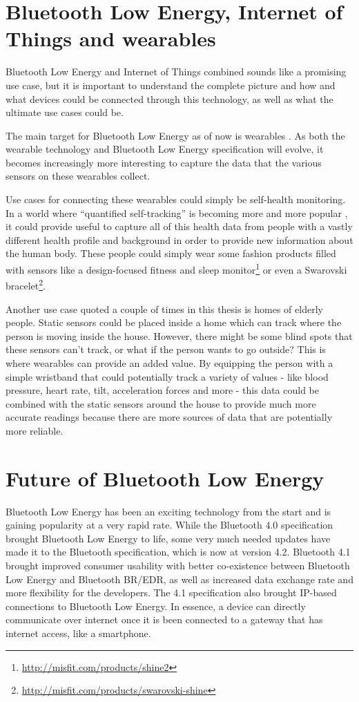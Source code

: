 \documentclass[pdftex,a4paper,12pt,twoside]{report}
\begin{document}
\section{Bluetooth Low Energy, Internet of Things and wearables}
\label{sec:bleiotwearables}
Bluetooth Low Energy and Internet of Things combined sounds like a promising use case, but it is important to understand the complete picture and how and what devices could be connected through this technology, as well as what the ultimate use cases could be.

The main target for Bluetooth Low Energy as of now is wearables \citep{blakesnow2016}. As both the wearable technology and Bluetooth Low Energy specification will evolve, it becomes increasingly more interesting to capture the data that the various sensors on these wearables collect.

Use cases for connecting these wearables could simply be self-health monitoring. In a world where ``quantified self-tracking'' is becoming more and more popular \citep{swan2012sensor}, it could provide useful to capture all of this health data from people with a vastly different health profile and background in order to provide new information about the human body. These people could simply wear some fashion products filled with sensors like a design-focused fitness and sleep monitor\footnote{\url{http://misfit.com/products/shine2}} or even a Swarovski bracelet\footnote{\url{http://misfit.com/products/swarovski-shine}}.

Another use case quoted a couple of times in this thesis is homes of elderly people. Static sensors could be placed inside a home which can track where the person is moving inside the house. However, there might be some blind spots that these sensors can't track, or what if the person wants to go outside? This is where wearables can provide an added value. By equipping the person with a simple wristband that could potentially track a variety of values - like blood pressure, heart rate, tilt, acceleration forces and more - this data could be combined with the static sensors around the house to provide much more accurate readings because there are more sources of data that are potentially more reliable.


\section{Future of Bluetooth Low Energy}
\label{sec:futureble}
Bluetooth Low Energy has been an exciting technology from the start and is gaining popularity at a very rapid rate. While the Bluetooth 4.0 specification brought Bluetooth Low Energy to life, some very much needed updates have made it to the Bluetooth specification, which is now at version 4.2. Bluetooth 4.1 brought improved consumer usability with better co-existence between Bluetooth Low Energy and Bluetooth BR/EDR, as well as increased data exchange rate and more flexibility for the developers. The 4.1 specification also brought IP-based connections to Bluetooth Low Energy. In essence, a device can directly communicate over internet once it is been connected to a gateway that has internet access, like a smartphone.
\end{document}
